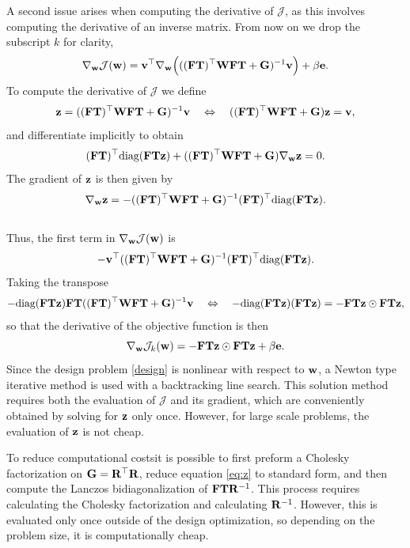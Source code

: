 \documentclass[12pt]{article}
\newcommand {\bfv}   { {\bf v} }
\newcommand {\bfe}   { {\bf e} }
\newcommand {\bfw}   { {\bf w} }
\newcommand {\bfz}   { {\bf z} }
\newcommand {\bfF}  { {\bf F} }
\newcommand{\bF}  { {\bf F} }      %
\newcommand{\bG}  { {\bf G} }      %
\newcommand{\bR}  { {\bf R} }      %
\newcommand{\bT}  {\text{\bf T}} %
\newcommand{\JJ}  {\mathcal{J}}    %
\newcommand{\W}{\text{\bf W}}
\begin{document}
A second issue arises when computing the derivative  of $\JJ$, as this involves computing the derivative of an inverse matrix. From now on we drop the subscript $k$ for clarity,
\begin{equation*}
\nabla_{\bfw} \JJ(\bfw) =\bfv^{\top} \nabla_{\bfw}\Big(((\bfF \bT)^{\top} \W \bfF\bT + \bG)^{-1}\bfv \Big) + \beta \bfe.
\end{equation*}
To compute  the derivative of $\JJ$ we define  
\begin{equation}
\label{eq:z}
\bfz = ((\bfF \bT)^{\top} \W \bfF \bT + \bG)^{-1}\bfv \quad \Leftrightarrow \quad
((\bfF \bT)^{\top} \W \bfF \bT + \bG)\bfz = \bfv,
\end{equation}
%
and differentiate implicitly to obtain 
\begin{equation*}
(\bfF \bT)^{\top}\text{diag}(\bfF \bT \bfz) + ((\bfF \bT)^{\top} \W \bfF \bT + \bG)\nabla_{\bfw}\bfz = 0.
\end{equation*}
The gradient of $\bfz$ is then given by
\begin{equation*}
\nabla_{\bfw}\bfz = -((\bfF \bT)^{\top} \W \bfF \bT + \bG)^{-1} (\bfF \bT)^{\top}\text{diag}(\bfF \bT \bfz).
\end{equation*}
\\
Thus, the first term in $\nabla_{\bfw} \JJ(\bfw)$ is
\begin{equation*}
-\bfv^{\top}((\bfF \bT)^{\top} \W \bfF \bT + \bG)^{-1} (\bfF \bT)^{\top}\text{diag}(\bfF \bT \bfz). 
\end{equation*}
Taking the transpose 
\begin{equation*}
-\text{diag}(\bfF \bT\bfz)\bfF\bT((\bfF\bT)^{\top} \W \bfF\bT + \bG)^{-1} \bfv
\quad \Leftrightarrow\quad -\text{diag}(\bfF \bT\bfz)(\bfF \bT\bfz) = -\bfF\bT \bfz \odot \bfF\bT \bfz,
\end{equation*}
so that the derivative of the objective function is then 
\begin{equation}
\nabla_{\bfw} \JJ_{k}(\bfw) =  -\bfF\bT \bfz \odot \bfF \bT\bfz + \beta \bfe.
\end{equation}
Since the design problem \eqref{design} is nonlinear with respect to $\bfw$, a Newton type iterative method is used with a backtracking line search. This solution method requires both the evaluation of $\JJ$ and  its gradient, which are conveniently obtained by solving for $\bfz$ only once. However, for large scale problems, the evaluation of $\bfz$ is not cheap.



To reduce computational costsit is possible to first preform a Cholesky factorization on $\bG = \bR^{\top}\bR$, reduce equation \eqref{eq:z} to standard form, and then compute the  Lanczos bidiagonalization of $\bF \bT \bR^{-1}$. This process requires calculating the Cholesky factorization and  calculating $\bR^{-1}$. However, this  is evaluated only once outside of the design optimization, so depending on the problem size, it is computationally cheap. 
\end{document}
